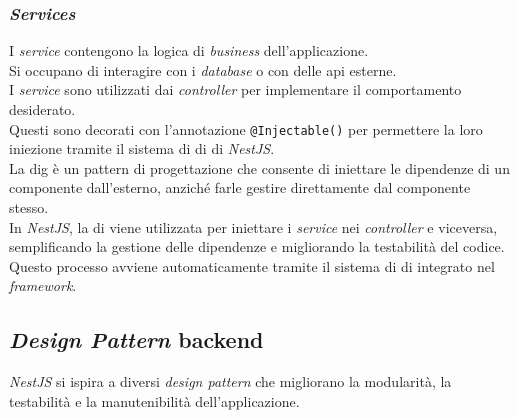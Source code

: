 \subsubsection{\textit{Services}}
I \textit{service} contengono la logica di \textit{business} dell'applicazione.\\
Si occupano di interagire con i \textit{database} o con delle \gls{api} esterne.\\
I \textit{service} sono utilizzati dai \textit{controller} per implementare il comportamento desiderato. \\
Questi sono decorati con l'annotazione \texttt{@Injectable()} per permettere la loro iniezione tramite il sistema di \gls{di} di \textit{NestJS}.\\

\noindent La \gls{dig} è un pattern di progettazione che consente di iniettare le dipendenze di un componente dall'esterno, anziché farle gestire direttamente dal componente stesso. \\
In \textit{NestJS}, la \gls{di} viene utilizzata per iniettare i \textit{service} nei \textit{controller} e viceversa, semplificando la gestione delle dipendenze e migliorando la testabilità del codice. \\
Questo processo avviene automaticamente tramite il sistema di \gls{di} integrato nel \textit{framework}.

\pagebreak
\subsection*{\textit{Design Pattern} \gls{backend}}

\textit{NestJS} si ispira a diversi \textit{design pattern} che migliorano la modularità, la testabilità e la manutenibilità dell'applicazione.\\

